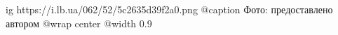  
 
 
 
 

\ifcmt
  ig https://i.lb.ua/062/52/5c2635d39f2a0.png
	@caption Фото: предоставлено автором
  @wrap center
  @width 0.9
\fi

